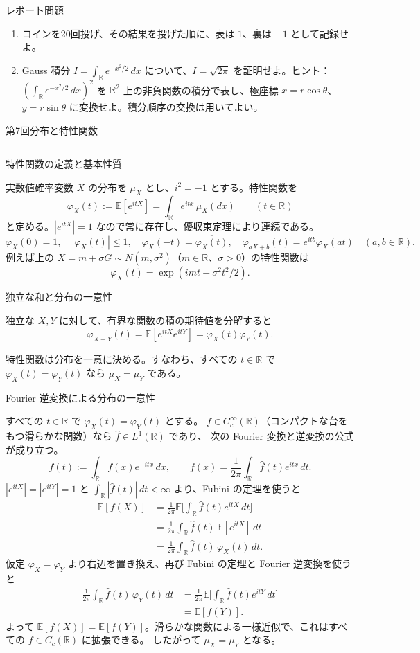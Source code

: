 \documentclass[a4paper,10pt,pdflatex,ja=standard,jafont=ipaex-type1,
  magstyle=real,scale=1]{bxjsarticle}
\newcommand{\lecturenumber}{6}
\newcommand{\topic}[1]{\par\vspace{5pt}
  {\large\sffamily\mdseries\color{accent}#1}\par\vspace{2pt}}
\newcommand{\handouttitle}[1]{%
  \pdfbookmark[0]{#1}{lecture\lecturenumber}%
  \begin{center}
    {\Large\color{ink}#1}\par\vspace{3mm}
    {\color{accent}\rule{0.88\linewidth}{0.7pt}}
  \end{center}\vspace{-2mm}}
\newcommand{\keybox}[1]{\par\vspace{3pt}\begingroup
  \setlength{\fboxsep}{5pt}
  \colorbox{soft}{\parbox{\dimexpr\linewidth-2\fboxsep\relax}{#1}}%
  \endgroup\par\vspace{2pt}}
\newcommand{\R}{\mathbb R}
\newcommand{\E}{\mathbb E}
\begin{document}
\topic{レポート問題}
\begin{enumerate}[label=\arabic*.]
  \item コインを20回投げ、その結果を投げた順に、表は $1$、裏は $-1$ として記録せよ。
  \item Gauss 積分 $I=\int_\R e^{-x^2/2}\,dx$ について、$I=\sqrt{2\pi}$ を証明せよ。ヒント：$(\int_\R e^{-x^2/2}\,dx)^2$ を $\R^2$ 上の非負関数の積分で表し、極座標
  $x=r\cos\theta$、$y=r\sin\theta$ に変換せよ。積分順序の交換は用いてよい。
\end{enumerate}
\clearpage
\renewcommand{\lecturenumber}{7}
\handouttitle{第7回\quad 分布と特性関数}

\topic{特性関数の定義と基本性質}
実数値確率変数 $X$ の分布を $\mu_X$ とし、$i^2=-1$ とする。特性関数を
$$
  \varphi_X(t):=\E[e^{itX}]=\int_\R e^{itx}\,\mu_X(dx)\qquad(t\in\R)
$$
と定める。$|e^{itX}|=1$ なので常に存在し、優収束定理により連続である。
$$
  \varphi_X(0)=1,\quad |\varphi_X(t)|\le1,\quad
  \varphi_X(-t)=\overline{\varphi_X(t)},\quad
  \varphi_{aX+b}(t)=e^{itb}\varphi_X(at)\quad(a,b\in\R).
$$
例えば上の $X=m+\sigma G\sim N(m,\sigma^2)$（$m\in\R$、$\sigma>0$）の特性関数は
$$\varphi_X(t)=\exp(imt-\sigma^2t^2/2).$$

\topic{独立な和と分布の一意性}
独立な $X,Y$ に対して、有界な関数の積の期待値を分解すると
$$\varphi_{X+Y}(t)=\E[e^{itX}e^{itY}]=\varphi_X(t)\varphi_Y(t).$$
\keybox{特性関数は分布を一意に決める。すなわち、すべての $t\in\R$ で
$\varphi_X(t)=\varphi_Y(t)$ なら $\mu_X=\mu_Y$ である。}

\topic{Fourier 逆変換による分布の一意性}
すべての $t\in\R$ で $\varphi_X(t)=\varphi_Y(t)$ とする。
$f\in C_c^\infty(\R)$（コンパクトな台をもつ滑らかな関数）なら $\widehat f\in L^1(\R)$ であり、
次の Fourier 変換と逆変換の公式が成り立つ。
$$
  \widehat f(t):=\int_\R f(x)e^{-itx}\,dx,\qquad
  f(x)=\frac1{2\pi}\int_\R\widehat f(t)e^{itx}\,dt.
$$
$|e^{itX}|=|e^{itY}|=1$ と $\int_\R|\widehat f(t)|\,dt<\infty$ より、Fubini の定理を使うと
$$
  \begin{aligned}
    \E[f(X)]
      &=\textstyle\frac1{2\pi}\E\bigl[\int_\R\widehat f(t)e^{itX}\,dt\bigr]\\
      &=\textstyle\frac1{2\pi}\int_\R\widehat f(t)\,\E[e^{itX}]\,dt\\
      &=\textstyle\frac1{2\pi}\int_\R\widehat f(t)\,\varphi_X(t)\,dt.
  \end{aligned}
$$
仮定 $\varphi_X=\varphi_Y$ より右辺を置き換え、再び Fubini の定理と Fourier 逆変換を使うと
$$
  \begin{aligned}
    \textstyle\frac1{2\pi}\int_\R\widehat f(t)\,\varphi_Y(t)\,dt
      &=\textstyle\frac1{2\pi}\E\bigl[\int_\R\widehat f(t)e^{itY}\,dt\bigr]\\
      &=\E[f(Y)].
  \end{aligned}
$$
よって $\E[f(X)]=\E[f(Y)]$。滑らかな関数による一様近似で、これはすべての $f\in C_c(\R)$ に拡張できる。
したがって $\mu_X=\mu_Y$ となる。
\end{document}
